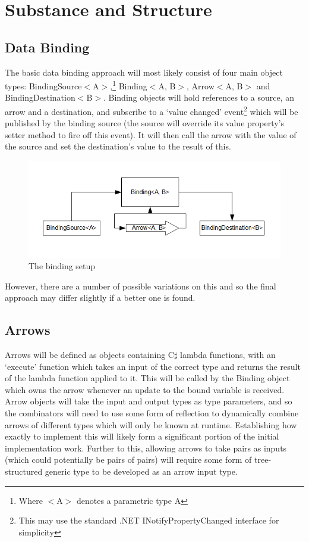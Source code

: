 \section*{Substance and Structure}

	\subsection*{Data Binding}
		The basic data binding approach will most likely consist of four main object types: Binding\-Source$<$A$>$,\footnote{Where $<$A$>$ denotes a parametric type A} Binding$<$A, B$>$, Arrow$<$A, B$>$ and Binding\-Destin\-ation$<$B$>$. Binding objects will hold references to a source, an arrow and a destination, and subscribe to a `value changed' event\footnote{This may use the standard .NET INotifyPropertyChanged interface for simplicity\cite{notifypropertychanged}} which will be published by the binding source (the source will override its value property's setter method to fire off this event). It will then call the arrow with the value of the source and set the destination's value to the result of this.
		
		\begin{figure}[htb]
			\centering
			\includegraphics[scale=0.7]{Binding.png}
			\caption{The binding setup}
		\end{figure}
		
		However, there are a number of possible variations on this and so the final approach may differ slightly if a better one is found.
	
	\subsection*{Arrows}
		Arrows will be defined as objects containing C$\sharp$ lambda functions, with an `execute' function which takes an input of the correct type and returns the result of the lambda function applied to it. This will be called by the Binding object which owns the arrow whenever an update to the bound variable is received. Arrow objects will take the input and output types as type parameters, and so the combinators will need to use some form of reflection to dynamically combine arrows of different types which will only be known at runtime. Establishing how exactly to implement this will likely form a significant portion of the initial implementation work. Further to this, allowing arrows to take pairs as inputs (which could potentially be pairs of pairs) will require some form of tree-structured generic type to be developed as an arrow input type.
	
